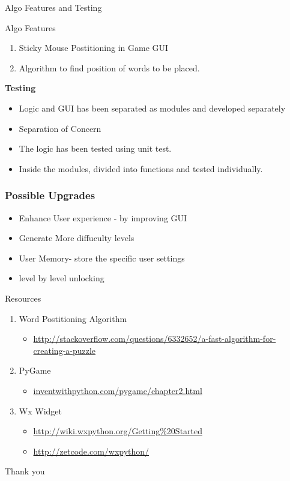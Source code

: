 \documentclass[handout]{beamer}%
\begin{document}
\begin{frame}{Algo Features and Testing}
\begin{block}{Algo Features}
\begin{enumerate}
\item  Sticky Mouse Postitioning in Game GUI
\item Algorithm to find position of words to be placed. 
\end{enumerate}
\textbf{Testing}
\begin{itemize}
\item Logic and GUI has been separated as modules and developed separately
\item Separation of Concern
\item The logic has been tested using unit test.
\item Inside the modules, divided into functions and tested individually.
\end{itemize}


\end{block}


\end{frame}



\begin{frame}
\frametitle{Possible Upgrades}

\begin{itemize}
\item Enhance User experience - by improving GUI
\item Generate More diffuculty levels
\item User Memory- store the specific user settings 
\item level by level unlocking
\end{itemize}

\end{frame}


\begin{frame}{Resources}
\begin{enumerate}

\item Word Postitioning Algorithm
\begin{itemize}[]
\item \url{http://stackoverflow.com/questions/6332652/a-fast-algorithm-for-creating-a-puzzle}
\end{itemize}

\item PyGame  
\begin{itemize}[]
\item \url{inventwithpython.com/pygame/chapter2.html}

\end{itemize}

\item Wx Widget
\begin{itemize}[]
\item \url{http://wiki.wxpython.org/Getting\%20Started}
\item \url{http://zetcode.com/wxpython/}
\end{itemize}

\end{enumerate}

\end{frame}
% 

\begin{frame}
\Huge{\centerline{Thank you}}
\end{frame}
\end{document}
